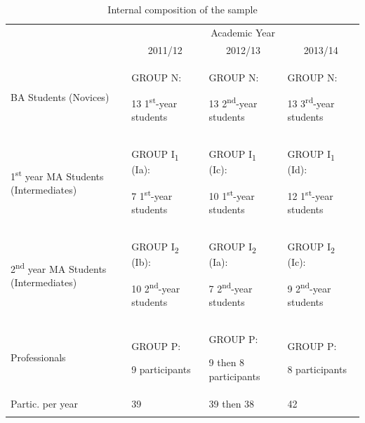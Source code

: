 \documentclass[output=paper]{LSP/langsci}
\begin{document}
\begin{table}
\footnotesize
\caption{Internal composition of the sample}
\label{quinci:tab:1}
\begin{tabularx}{\textwidth}{>{\raggedright}XXXX}
\lsptoprule
 & \multicolumn{3}{c}{Academic Year}\\\cmidrule(lr){2-4}
 & \multicolumn{1}{c}{2011/12} & \multicolumn{1}{c}{2012/13} & \multicolumn{1}{c}{2013/14}\\\midrule
 BA Students (Novices) & GROUP N:\par 13 1\textsuperscript{st}-year students & GROUP N:\par 13 2\textsuperscript{nd}-year students & GROUP N:\par 13 3\textsuperscript{rd}-year students\\
 1\textsuperscript{st} year MA Students (Intermediates) &  GROUP I\textsubscript{1} (Ia):\par 7 1\textsuperscript{st}-year students & GROUP I\textsubscript{1} (Ic):\par 10 1\textsuperscript{st}-year students &  GROUP I\textsubscript{1} (Id):\par 12 1\textsuperscript{st}-year students\\
 2\textsuperscript{nd} year MA Students (Intermediates) & GROUP I\textsubscript{2} (Ib):\par 10 2\textsuperscript{nd}-year students & GROUP I\textsubscript{2} (Ia):\par 7 2\textsuperscript{nd}-year students & GROUP I\textsubscript{2} (Ic):\par 9 2\textsuperscript{nd}-year students\\
 Professionals & GROUP P:\par 9 participants & GROUP P:\par 9 then 8 participants & GROUP P:\par 8 participants\\
 Partic. per year & 39 & 39 then 38 & 42\\
 \lspbottomrule
\end{tabularx}
\end{table}
\end{document}
